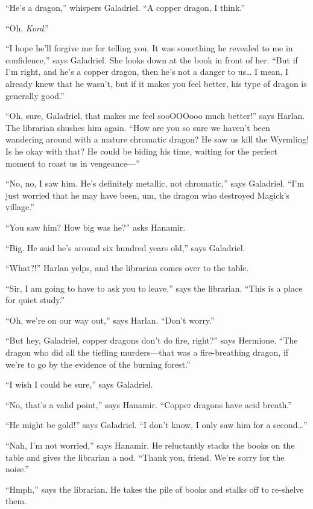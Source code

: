 \documentclass[smalldemyvopaper,11pt,twoside,onecolumn,openright,extrafontsizes]{memoir}
\begin{document}
``He's a dragon,'' whispers Galadriel. ``A copper dragon, I think.''

``Oh, \emph{Kord}.''

``I hope he'll forgive me for telling you. It was something he revealed
to me in confidence,'' says Galadriel. She looks down at the book in
front of her. ``But if I'm right, and he's a copper dragon, then he's
not a danger to us\ldots{} I mean, I already knew that he wasn't, but if
it makes you feel better, his type of dragon is generally good.''

``Oh, sure, Galadriel, that makes me feel sooOOOooo much better!'' says
Harlan. The librarian shushes him again. ``How are you so sure we
haven't been wandering around with a mature chromatic dragon? He saw us
kill the Wyrmling! Is he okay with that? He could be biding his time,
waiting for the perfect moment to roast us in vengeance---''

``No, no, I saw him. He's definitely metallic, not chromatic,'' says
Galadriel. ``I'm just worried that he may have been, um, the dragon who
destroyed Magick's village.''

``You saw him? How big was he?'' asks Hanamir.

``Big. He said he's around six hundred years old,'' says Galadriel.

``What?!'' Harlan yelps, and the librarian comes over to the table.

``Sir, I am going to have to ask you to leave,'' says the librarian.
``This is a place for quiet study.''

``Oh, we're on our way out,'' says Harlan. ``Don't worry.''

``But hey, Galadriel, copper dragons don't do fire, right?'' says
Hermione. ``The dragon who did all the tiefling murders---that was a
fire-breathing dragon, if we're to go by the evidence of the burning
forest.''

``I wish I could be sure,'' says Galadriel.

``No, that's a valid point,'' says Hanamir. ``Copper dragons have acid
breath.''

``He might be gold!'' says Galadriel. ``I don't know, I only saw him for
a second\ldots{}''

``Nah, I'm not worried,'' says Hanamir. He reluctantly stacks the books
on the table and gives the librarian a nod. ``Thank you, friend. We're
sorry for the noise.''

``Hmph,'' says the librarian. He takes the pile of books and stalks off
to re-shelve them.
\end{document}
